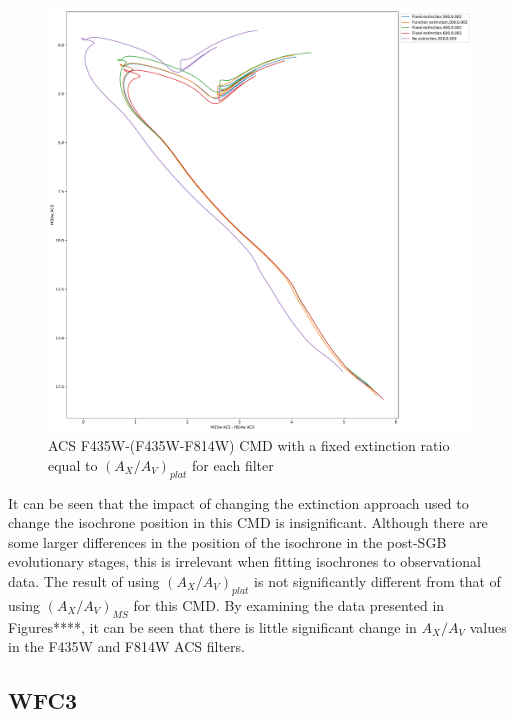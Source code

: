 \documentclass[12pt, a4paper]{report}
\begin{document}
\begin{figure}[h]
\begin{center}
\includegraphics[scale=0.3]{../basti_isochrones_10_13Gyr/Extinction_T50k_FeH0fix_func_f435wACS_f435wACSmf814wACS_500_400_600_Myr_FeH_0p002_ref_noext_Av_1p0.pdf}
\caption{ACS F435W-(F435W-F814W) CMD with a fixed extinction ratio equal to $(A_{X}/A_{V})_{plat}$ for each filter}
\label{acs_isoc_T50k}
\end{center}
\end{figure}

It can be seen that the impact of changing the extinction approach used to change the isochrone position in this CMD is insignificant. Although there are some larger differences in the position of the isochrone in the post-SGB evolutionary stages, this is irrelevant when fitting isochrones to observational data. The result of using $(A_{X}/A_{V})_{plat}$ is not significantly different from that of using $(A_{X}/A_{V})_{MS}$ for this CMD. By examining the data presented in Figures****, it can be seen that there is little significant change in $A_{X}/A_{V}$ values in the F435W and F814W ACS filters.

\subsection{WFC3} \label{WFC3_isoc}
\end{document}
